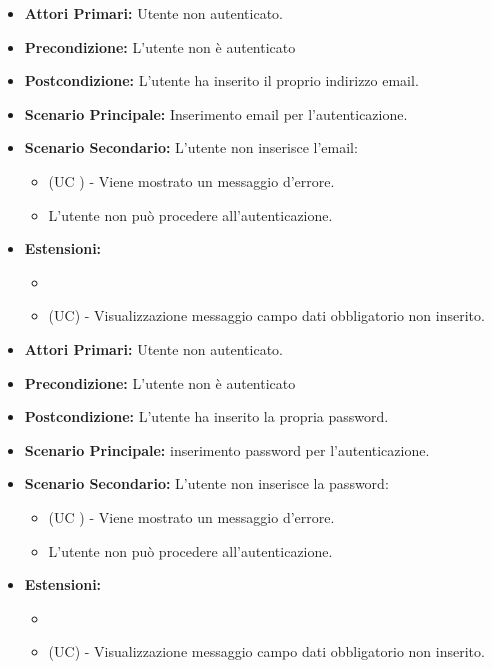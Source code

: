 \resetSubUC
{}
\begin{itemize}
	\item \textbf{Attori Primari:} Utente non autenticato.
	\item \textbf{Precondizione:} L'utente non è autenticato
	\item \textbf{Postcondizione:} L'utente ha inserito il proprio indirizzo email.
	\item \textbf{Scenario Principale:} Inserimento email per l'autenticazione.
	\item \textbf{Scenario Secondario:} L'utente non inserisce l'email:
	\begin{itemize}
		\item (UC ) - Viene mostrato un messaggio d'errore.
		\item L'utente non può procedere all'autenticazione.
	\end{itemize}
	\item \textbf{Estensioni:}
	\begin{itemize}
		\item \item (UC) - Visualizzazione messaggio campo dati obbligatorio non inserito.
	\end{itemize}
\end{itemize}

\begin{itemize}
	\item \textbf{Attori Primari:} Utente non autenticato.
	\item \textbf{Precondizione:} L'utente non è autenticato
	\item \textbf{Postcondizione:} L'utente ha inserito la propria password.
	\item \textbf{Scenario Principale:} inserimento password per l'autenticazione.
	\item \textbf{Scenario Secondario:} L'utente non inserisce la password:
	\begin{itemize}
		\item (UC ) - Viene mostrato un messaggio d'errore.
		\item L'utente non può procedere all'autenticazione.
	\end{itemize}
	\item \textbf{Estensioni:}
	\begin{itemize}
		\item \item (UC) - Visualizzazione messaggio campo dati obbligatorio non inserito.
	\end{itemize}
\end{itemize}

